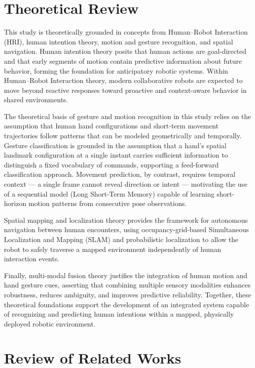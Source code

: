 \section{Theoretical Review}

This study is theoretically grounded in concepts from Human--Robot Interaction (HRI), human intention theory, motion and gesture recognition, and spatial navigation. Human intention theory posits that human actions are goal-directed and that early segments of motion contain predictive information about future behavior, forming the foundation for anticipatory robotic systems. Within Human--Robot Interaction theory, modern collaborative robots are expected to move beyond reactive responses toward proactive and context-aware behavior in shared environments.

The theoretical basis of gesture and motion recognition in this study relies on the
assumption that human hand configurations and short-term movement trajectories follow
patterns that can be modeled geometrically and temporally. Gesture classification is
grounded in the assumption that a hand's spatial landmark configuration at a single
instant carries sufficient information to distinguish a fixed vocabulary of commands,
supporting a feed-forward classification approach. Movement prediction, by contrast,
requires temporal context — a single frame cannot reveal direction or intent —
motivating the use of a sequential model (Long Short-Term Memory) capable of learning
short-horizon motion patterns from consecutive pose observations.

Spatial mapping and localization theory provides the framework for autonomous
navigation between human encounters, using occupancy-grid-based Simultaneous
Localization and Mapping (SLAM) and probabilistic localization to allow the robot to
safely traverse a mapped environment independently of human interaction events.

Finally, multi-modal fusion theory justifies the integration of human motion and hand gesture cues, asserting that combining multiple sensory modalities enhances robustness, reduces ambiguity, and improves predictive reliability. Together, these theoretical foundations support the development of an integrated system capable of recognizing and predicting human intentions within a mapped, physically deployed robotic environment.

\section{Review of Related Works}

